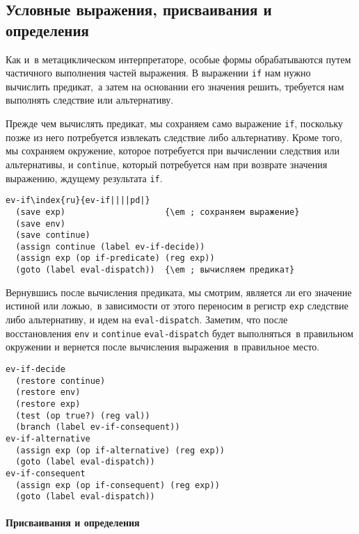 \subsection{Условные выражения, присваивания и определения}
\label{CONDITIONALS-ASSIGNMENTS-AND-DEFINITIONS}


Как и~в метациклическом интерпретаторе, особые формы
обрабатываются путем частичного выполнения частей выражения.  В
выражении {\tt if} нам нужно вычислить предикат,~а затем на основании
его значения решить, требуется нам выполнять следствие или
альтернативу.

Прежде чем вычислять предикат, мы сохраняем само выражение
{\tt if}, поскольку позже из него потребуется извлекать
следствие либо альтернативу.  Кроме того, мы сохраняем окружение,
которое потребуется при вычислении следствия или альтернативы, и
{\tt continue}, который потребуется нам при возврате значения
выражению, ждущему результата {\tt if}.

\begin{Verbatim}[fontsize=\small]
ev-if\index{ru}{ev-if||||pd|}
  (save exp)                    {\em ; сохраняем выражение}
  (save env)
  (save continue)
  (assign continue (label ev-if-decide))
  (assign exp (op if-predicate) (reg exp))
  (goto (label eval-dispatch))  {\em ; вычисляем предикат}
\end{Verbatim}

Вернувшись после вычисления предиката, мы смотрим, является
ли его значение истиной или ложью,~в зависимости от этого переносим в
регистр {\tt exp} следствие либо альтернативу, и идем на
{\tt eval-dispatch}.  Заметим, что после восстановления
{\tt env} и {\tt continue} {\tt eval-dispatch}
будет выполняться~в правильном окружении и вернется после вычисления
выражения~в правильное место.

\begin{Verbatim}[fontsize=\small]
ev-if-decide
  (restore continue)
  (restore env)
  (restore exp)
  (test (op true?) (reg val))
  (branch (label ev-if-consequent))
ev-if-alternative
  (assign exp (op if-alternative) (reg exp))
  (goto (label eval-dispatch))
ev-if-consequent
  (assign exp (op if-consequent) (reg exp))
  (goto (label eval-dispatch))
\end{Verbatim}

\paragraph{Присваивания и определения}


